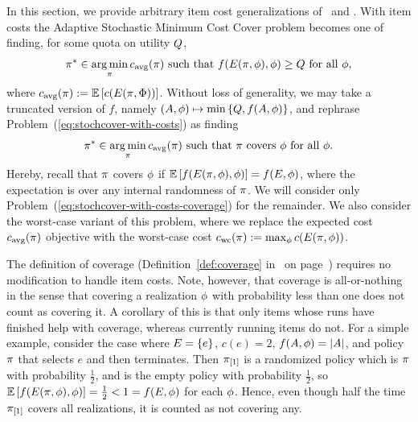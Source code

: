In this section, we provide arbitrary item cost generalizations
of~ and
. 
With item costs the Adaptive Stochastic Minimum Cost Cover problem
becomes one of finding, for some quota on utility $Q$,   
\begin{equation}
\pi^{*}\in\mathop{\rm arg\,min}_{\pi} {c_{\text{avg}}{(\pi)}}\text{ such that }
f(E({\pi}, {{\color{black}{\ensuremath{\phi}}}}),{\color{black}{\ensuremath{\phi}}})\geq Q\text{ for all
}{\color{black}{\ensuremath{\phi}}},\label{eq:stochcover-with-costs}
\end{equation}
where  ${c_{\text{avg}}{(\pi)}}:=\mathbb{E}\left[c(E({\pi}, {{\color{black}{\ensuremath{\Phi}}}}))\right]$.
Without loss of generality, we may take a truncated version of $f$,
namely $(A, {\color{black}{\ensuremath{\phi}}}) \mapsto \min \left\{Q, f(A, {\color{black}{\ensuremath{\phi}}})\right\}$, and
rephrase Problem~(\ref{eq:stochcover-with-costs}) as finding
\begin{equation}
  \label{eq:stochcover-with-costs-coverage}
  \pi^{*}\in\mathop{\rm arg\,min}_{\pi} {c_{\text{avg}}{(\pi)}}\text{ such that }
\pi \text{ covers }{\color{black}{\ensuremath{\phi}}} \text{ for all
}{\color{black}{\ensuremath{\phi}}}. 
\end{equation}
Hereby, recall that $\pi$ covers ${\color{black}{\ensuremath{\phi}}}$ if
$\mathbb{E}\left[f(E({\pi}, {{\color{black}{\ensuremath{\phi}}}}),{\color{black}{\ensuremath{\phi}}})\right] = f(E,{\color{black}{\ensuremath{\phi}}})$, 
where the expectation is over any internal randomness of $\pi$.
We will consider only
Problem~(\ref{eq:stochcover-with-costs-coverage}) for the
remainder.
We also consider the worst-case variant of this problem, where we
replace the expected cost ${c_{\text{avg}}{(\pi)}}$ objective with the worst-case cost
${c_{\text{wc}}{(\pi)}} := \max_{{\color{black}{\ensuremath{\phi}}}}{c(E({\pi}, {{\color{black}{\ensuremath{\phi}}}}))}$.

The definition of coverage (Definition~\ref{def:coverage}
in~ on page~\pageref{def:coverage}) requires no
modification to handle item costs.
Note, however, that coverage is all-or-nothing in the sense that 
covering a realization ${\color{black}{\ensuremath{\phi}}}$ with probability less than one does not count
as covering it.  A corollary of this is that 
only items whose runs have finished help with coverage, 
whereas currently running items do not.  For a simple example, 
consider the case where $E = \left\{e\right\}$, $c(e) = 2$, 
$f(A, {\color{black}{\ensuremath{\phi}}}) = |A|$, and 
policy $\pi$ that selects $e$ and then
terminates.  Then $ \pi_{[{1}]} $ is a randomized policy which is
$\pi$ with probability $\frac12$, and is the empty policy with
probability $\frac12$, so 
$\mathbb{E}\left[f(E({\pi}, {{\color{black}{\ensuremath{\phi}}}}),{\color{black}{\ensuremath{\phi}}})\right] = \frac12 < 1 =
f(E,{\color{black}{\ensuremath{\phi}}})$ for each ${\color{black}{\ensuremath{\phi}}}$.  Hence, even though half the time
$ \pi_{[{1}]} $ covers all realizations, it is counted as not 
covering any. \\



